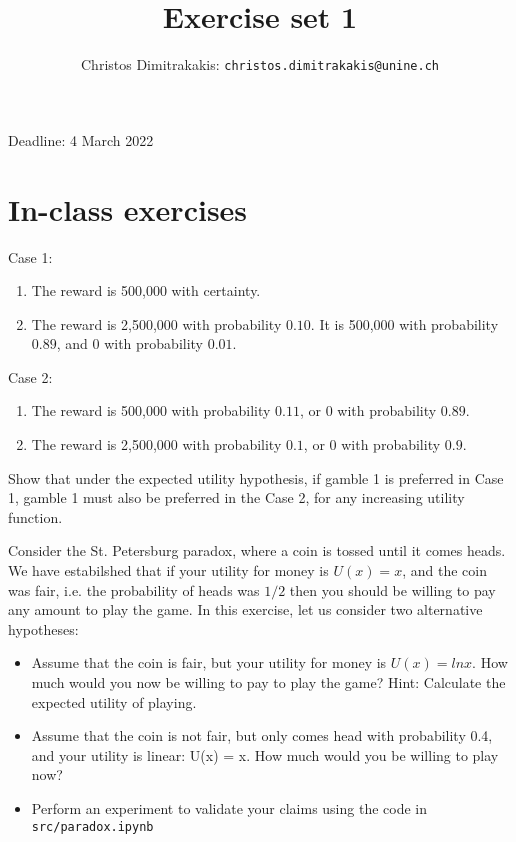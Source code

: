 \documentclass[twoside,a4paper]{article}
\begin{document}
\title{Exercise set 1}
\author{Christos Dimitrakakis: \texttt{christos.dimitrakakis@unine.ch}}

\maketitle
\large{Deadline: 4 March 2022}

\vspace{1em}

\section{In-class exercises}
\begin{exercise}
  Case 1:
  \begin{enumerate}
  \item The reward is 500,000 with certainty.
  \item The reward is 2,500,000 with probability $0.10$. It is 500,000 with probability $0.89$, and 0 with probability $0.01$.
  \end{enumerate}

  Case 2:
  \begin{enumerate}
  \item The reward is 500,000 with probability $0.11$, or 0 with probability $0.89$.
  \item The reward is 2,500,000 with probability $0.1$, or 0 with probability $0.9$.
  \end{enumerate}

  Show that under the expected utility hypothesis, if gamble 1 is preferred in Case 1, gamble 1 must also be preferred in the Case 2, for any increasing utility function.
\end{exercise}

\begin{exercise}[15]
  Consider the St. Petersburg paradox, where a coin is tossed until it comes heads. 
  We have estabilshed that if your utility for money is $U(x) = x$, and the coin was fair, i.e. the probability of heads was $1/2$
  then you should be willing to pay any amount to play the game. In this exercise, let us consider two alternative hypotheses:
  \begin{itemize}
  \item  Assume that the coin is fair, but your utility for money is $U(x) = ln x$. How much
    would you now be willing to pay to play the game? Hint: Calculate the expected
    utility of playing.
  \item Assume that the coin is not fair, but only comes head with probability 0.4, and your
    utility is linear: U(x) = x. How much would you be willing to play now?
  \item Perform an experiment to validate your claims using the code in \verb!src/paradox.ipynb!
  \end{itemize}
\end{exercise}
\end{document}
